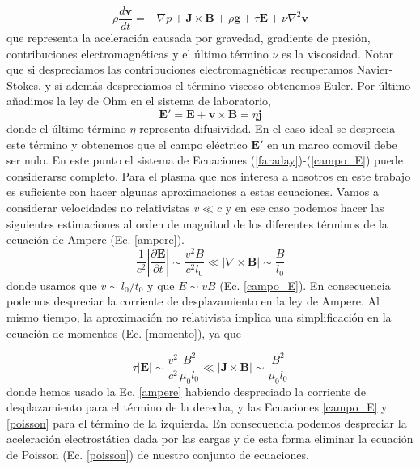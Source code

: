 \documentclass[a4paper,11pt]{report}
\begin{document}
\begin{equation}
\rho \frac{d\boldsymbol{v}}{dt} = - \nabla p + \boldsymbol{J} \times \boldsymbol{B} +\rho \boldsymbol{g} +\tau \boldsymbol{E}+\nu\nabla^2\boldsymbol{v} \label{momento}
\end{equation}
que representa la aceleración causada por gravedad, gradiente de presión, contribuciones electromagnéticas y el último término $\nu$ es la viscosidad. Notar que si despreciamos las contribuciones electromagnéticas recuperamos Navier-Stokes, y si además despreciamos el término viscoso obtenemos Euler.
Por último añadimos la ley de Ohm en el sistema de laboratorio,
\begin{equation}
\boldsymbol{E'} = \boldsymbol{E} + \boldsymbol{v} \times \boldsymbol{B} = \eta \boldsymbol{j} \label{campo_E}
\end{equation}
donde el último término $\eta$ representa difusividad. En el caso ideal se desprecia este término y obtenemos que el campo eléctrico $\boldsymbol{E'}$ en un marco comovil debe ser nulo.
En este punto el sistema de Ecuaciones (\ref{faraday})-(\ref{campo_E}) puede considerarse completo. Para el plasma que nos interesa a nosotros en este trabajo es suficiente con hacer algunas aproximaciones a estas ecuaciones. Vamos a considerar velocidades no relativistas $v\ll c$ y en ese caso podemos hacer las siguientes estimaciones al orden de magnitud de los diferentes términos de la ecuación de Ampere (Ec. \ref{ampere}).
\begin{equation}
\frac{1}{c^2} \left| \frac{\partial \boldsymbol{E}}{\partial t} \right| \sim \frac{v^2 B}{c^2 l_0} \ll \left| \nabla \times \boldsymbol{B} \right| \sim \frac{B}{l_0}
\end{equation}
donde usamos que $v\sim l_0/t_0$ y que $E\sim v B$ (Ec. \ref{campo_E}). En consecuencia podemos despreciar la corriente de desplazamiento en la ley de Ampere.
Al mismo tiempo, la aproximación no relativista implica una simplificación en la ecuación de momentos (Ec. \ref{momento}), ya que

\begin{equation}
\tau \left| \boldsymbol{E} \right| \sim \frac{v^2}{c^2} \frac{B^2}{\mu_0 l_0} \ll \left| \boldsymbol{J} \times \boldsymbol{B}\right| \sim \frac{B^2}{\mu_0 l_0}
\end{equation}
donde hemos usado la Ec. \ref{ampere} habiendo despreciado la corriente de desplazamiento para el término de la derecha, y las Ecuaciones \ref{campo_E} y \ref{poisson} para el término de la izquierda. En consecuencia podemos despreciar la aceleración electrostática dada por las cargas y de esta forma eliminar la ecuación de Poisson (Ec. \ref{poisson}) de nuestro conjunto de ecuaciones.
\end{document}
